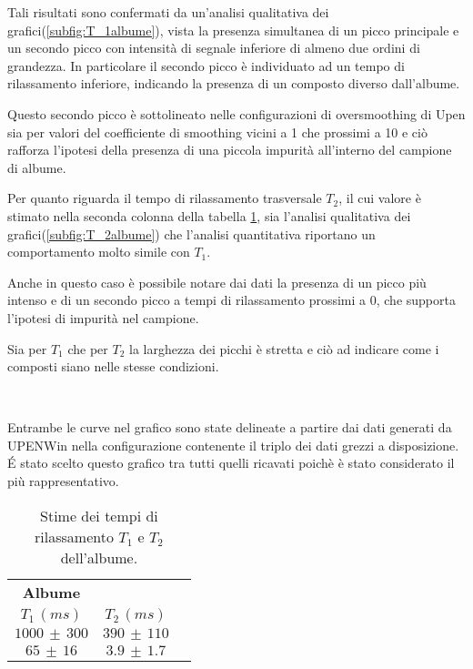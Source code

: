 Tali risultati sono confermati da un'analisi qualitativa dei grafici(\ref{subfig:T_1albume}), vista la presenza simultanea di un picco principale e un secondo picco con intensità di segnale inferiore di almeno due ordini di grandezza. 
In particolare il secondo picco è individuato ad un tempo di rilassamento inferiore, indicando la presenza di un composto diverso dall'albume.

Questo secondo picco è sottolineato nelle configurazioni di oversmoothing di Upen sia per valori del coefficiente di smoothing vicini a 1 che prossimi a 10 e ciò rafforza l'ipotesi della presenza di una piccola impurità all'interno del campione di albume. 

Per quanto riguarda il tempo di rilassamento trasversale $T_2$, il cui valore è stimato nella seconda colonna della tabella \ref{tab:Albume}, sia l'analisi qualitativa dei grafici(\ref{subfig:T_2albume}) che l'analisi quantitativa riportano un comportamento molto simile con $T_1$.

Anche in questo caso è possibile notare dai dati la presenza di un picco più intenso e di un secondo picco a tempi di rilassamento prossimi a 0, che supporta l'ipotesi di impurità nel campione.

Sia per $T_1$ che per $T_2$ la larghezza dei picchi è stretta e ciò ad indicare come i composti siano nelle stesse condizioni. 

\begin{figure}[h!]
\centering
{} \quad
{} \\
\caption{}
\label{fig:T_albume}
\end{figure}

Entrambe le curve nel grafico sono state delineate a partire dai dati generati da UPENWin nella configurazione contenente il triplo dei dati grezzi a disposizione.
\'E stato scelto questo grafico tra tutti quelli ricavati poichè è stato considerato il più rappresentativo.

\begin{table}[h!]
	\centering
	\begin{tabular}{ccc}
	\toprule
					\textbf{Albume}	\\
		$T_1\,(ms)$ 		& 		$T_2\,(ms)$ 		\\	
	\midrule
		$1000\,\pm\,300$	&		$390\,\pm\,110$		\\
		$65\,\pm\,16$		&		$3.9\,\pm\,1.7$		\\
	\bottomrule
	\end{tabular}
	\caption{Stime dei tempi di rilassamento $T_1$ e $T_2$ dell'albume.}
	\label{tab:Albume}
\end{table}

